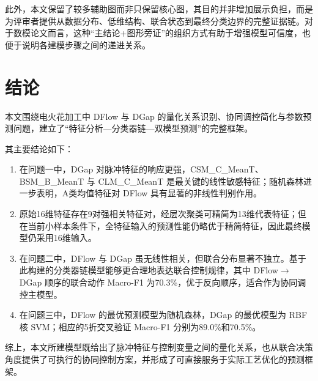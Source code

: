 \documentclass[UTF8,a4paper,12pt]{ctexart}
\begin{document}
此外，本文保留了较多辅助图而非只保留核心图，其目的并非增加展示负担，而是为评审者提供从数据分布、低维结构、联合状态到最终分类边界的完整证据链。对于数模论文而言，这种“主结论+图形旁证”的组织方式有助于增强模型可信度，也便于说明各建模步骤之间的递进关系。

\section{结论}

本文围绕电火花加工中 DFlow 与 DGap 的量化关系识别、协同调控简化与参数预测问题，建立了“特征分析—分类器链—双模型预测”的完整框架。

其主要结论如下：
\begin{enumerate}[label=(\arabic*),leftmargin=2em]
\item 在问题一中，DGap 对脉冲特征的响应更强，CSM\_C\_MeanT、BSM\_B\_MeanT 与 CLM\_C\_MeanT 是最关键的线性敏感特征；随机森林进一步表明，A类均值特征对 DFlow 具有显著的非线性判别作用。
\item 原始16维特征存在9对强相关特征对，经层次聚类可精简为13维代表特征；但在当前小样本条件下，全特征输入的预测性能仍略优于精简特征，因此最终模型仍采用16维输入。
\item 在问题二中，DFlow 与 DGap 虽无线性相关，但联合分布显著不独立。基于此构建的分类器链模型能够更合理地表达联合控制规律，其中 DFlow$\rightarrow$DGap 顺序的联合动作 Macro-F1 为70.3\%，优于反向顺序，适合作为协同调控主模型。
\item 在问题三中，DFlow 的最优预测模型为随机森林，DGap 的最优模型为 RBF 核 SVM；相应的5折交叉验证 Macro-F1 分别为89.0\%和70.5\%。
\end{enumerate}

综上，本文所建模型既给出了脉冲特征与控制变量之间的量化关系，也从联合决策角度提供了可执行的协同控制方案，并形成了可直接服务于实际工艺优化的预测框架。
\end{document}
